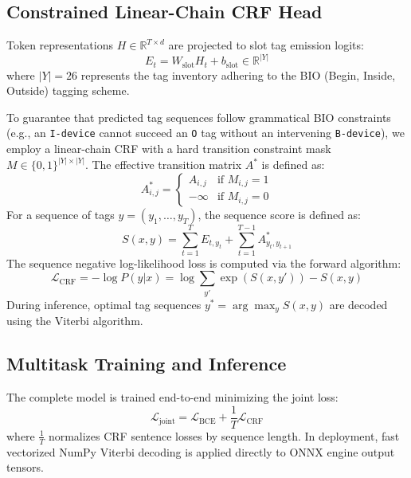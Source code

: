 \documentclass[letterpaper]{article}
\begin{document}
\subsection{Constrained Linear-Chain CRF Head}
Token representations $H \in \mathbb{R}^{T \times d}$ are projected to slot tag emission logits:
\begin{equation}
    E_t = W_{\text{slot}} H_t + b_{\text{slot}} \in \mathbb{R}^{|Y|}
\end{equation}
where $|Y| = 26$ represents the tag inventory adhering to the BIO (Begin, Inside, Outside) tagging scheme.

To guarantee that predicted tag sequences follow grammatical BIO constraints (e.g., an \texttt{I-device} cannot succeed an \texttt{O} tag without an intervening \texttt{B-device}), we employ a linear-chain CRF with a hard transition constraint mask $M \in \{0, 1\}^{|Y| \times |Y|}$. The effective transition matrix $A^*$ is defined as:
\begin{equation}
    A^*_{i,j} = \begin{cases} A_{i,j} & \text{if } M_{i,j} = 1 \\ -\infty & \text{if } M_{i,j} = 0 \end{cases}
\end{equation}
For a sequence of tags $y = (y_1, \dots, y_T)$, the sequence score is defined as:
\begin{equation}
    S(x, y) = \sum_{t=1}^T E_{t, y_t} + \sum_{t=1}^{T-1} A^*_{y_t, y_{t+1}}
\end{equation}
The sequence negative log-likelihood loss is computed via the forward algorithm:
\begin{equation}
    \mathcal{L}_{\text{CRF}} = -\log P(y|x) = \log \sum_{y'} \exp(S(x, y')) - S(x, y)
\end{equation}
During inference, optimal tag sequences $y^* = \arg\max_y S(x, y)$ are decoded using the Viterbi algorithm.

\subsection{Multitask Training and Inference}
The complete model is trained end-to-end minimizing the joint loss:
\begin{equation}
    \mathcal{L}_{\text{joint}} = \mathcal{L}_{\text{BCE}} + \frac{1}{T} \mathcal{L}_{\text{CRF}}
\end{equation}
where $\frac{1}{T}$ normalizes CRF sentence losses by sequence length. In deployment, fast vectorized NumPy Viterbi decoding is applied directly to ONNX engine output tensors.
\end{document}
